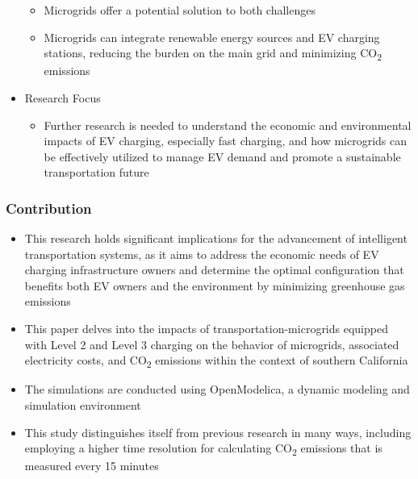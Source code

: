 \documentclass[aspectratio=169, 8 pt]{beamer}
\begin{document}
\begin{frame}
\begin{itemize}
\begin{itemize}
					\item Microgrids offer a potential solution to both challenges
					\item Microgrids can integrate renewable energy sources and EV charging stations, reducing the burden on the main grid and minimizing CO\textsubscript{2} emissions
				\end{itemize}
			\item Research Focus
				\begin{itemize} 
					\item Further research is needed to understand the economic and environmental impacts of EV charging, especially fast charging, and how microgrids can be effectively utilized to manage EV demand and promote a sustainable transportation future
				\end{itemize}
		\end{itemize}
	\end{frame}
	\begin{frame}
		\frametitle{Contribution}
		\large
		\begin{itemize}
			\item This research holds significant implications for the advancement of intelligent transportation systems, as it aims to address the economic needs of EV charging infrastructure owners and determine the optimal configuration that benefits both EV owners and the environment by minimizing greenhouse gas emissions
			\item This paper delves into the impacts of transportation-microgrids equipped with Level 2 and Level 3 charging on the behavior of microgrids, associated electricity costs, and CO\textsubscript{2} emissions within the context of southern California
			\item The simulations are conducted using OpenModelica, a dynamic modeling and simulation environment
			\item This study distinguishes itself from previous research in many ways, including employing a higher time resolution for calculating CO\textsubscript{2} emissions that is measured every 15 minutes
		\end{itemize}
	\end{frame}
\end{document}
